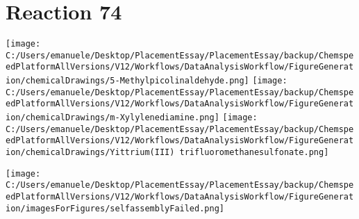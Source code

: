 \documentclass{article}%
\begin{document}
\section*{Reaction 74}%
%
\begin{scheme}[H]%
\begin{minipage}{0.5\textwidth}%
\texttt{[image: C:/Users/emanuele/Desktop/PlacementEssay/PlacementEssay/backup/ChemspeedPlatformAllVersions/V12/Workflows/DataAnalysisWorkflow/FigureGeneration/chemicalDrawings/5-Methylpicolinaldehyde.png]}%
\texttt{[image: C:/Users/emanuele/Desktop/PlacementEssay/PlacementEssay/backup/ChemspeedPlatformAllVersions/V12/Workflows/DataAnalysisWorkflow/FigureGeneration/chemicalDrawings/m-Xylylenediamine.png]}%
\texttt{[image: C:/Users/emanuele/Desktop/PlacementEssay/PlacementEssay/backup/ChemspeedPlatformAllVersions/V12/Workflows/DataAnalysisWorkflow/FigureGeneration/chemicalDrawings/Yittrium(III) trifluoromethanesulfonate.png]}%
\end{minipage}%
\begin{minipage}{0.5\textwidth}%
\begin{center}%
\texttt{[image: C:/Users/emanuele/Desktop/PlacementEssay/PlacementEssay/backup/ChemspeedPlatformAllVersions/V12/Workflows/DataAnalysisWorkflow/FigureGeneration/imagesForFigures/selfassemblyFailed.png]}%
\end{center}%
\end{minipage}%
\caption{Self-assembly of components 3, 18, with Yittrium(III) in a 3.0:1.5:1.0 molar ratio in CH$_3$CN at 60\textdegree C for 40h. These are the reagents (starting materials) for reaction 74.}%
\end{scheme}%
\end{document}
